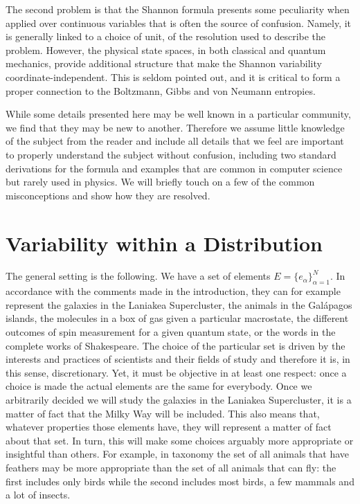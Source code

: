 \documentclass[iopart]{revtex4-1}
\begin{document}
The second problem is that the Shannon formula presents some peculiarity when applied over continuous variables that is often the source of confusion. Namely, it is generally linked to a choice of unit, of the resolution used to describe the problem. However, the physical state spaces, in both classical and quantum mechanics, provide additional structure that make the Shannon variability coordinate-independent. This is seldom pointed out, and it is critical to form a proper connection to the Boltzmann, Gibbs and von Neumann entropies.

While some details presented here may be well known in a particular community, we find that they may be new to another. Therefore we assume little knowledge of the subject from the reader and include all details that we feel are important to properly understand the subject without confusion, including two standard derivations for the formula and examples that are common in computer science but rarely used in physics. We will briefly touch on a few of the common misconceptions and show how they are resolved.

\section{Variability within a Distribution\label{vwd}}

The general setting is the following. We have a set of elements $E = \{e_\alpha\}_{\alpha=1}^N$. In accordance with the comments made in the introduction, they can for example represent the galaxies in the Laniakea Supercluster, the animals in the Gal\'{a}pagos islands, the molecules in a box of gas given a particular macrostate, the different outcomes of spin measurement for a given quantum state, or the words in the complete works of Shakespeare. The choice of the particular set is driven by the interests and practices of scientists and their fields of study and therefore it is, in this sense, discretionary. Yet, it must be objective in at least one respect: once a choice is made the actual elements are the same for everybody. Once we arbitrarily decided we will study the galaxies in the Laniakea Supercluster, it is a matter of fact that the Milky Way will be included. This also means that, whatever properties those elements have, they will represent a matter of fact about that set. In turn, this will make some choices arguably more appropriate or insightful than others. For example, in taxonomy the set of all animals that have feathers may be more appropriate than the set of all animals that can fly: the first includes only birds while the second includes most birds, a few mammals and a lot of insects.
\end{document}
